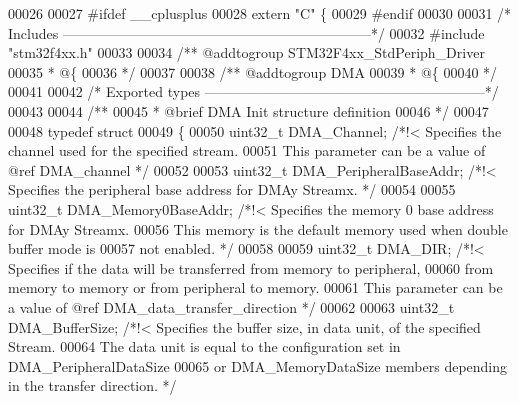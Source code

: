 \begin{DoxyCode}
00026 
00027 \textcolor{preprocessor}{#}\textcolor{preprocessor}{ifdef} \_\_cplusplus
00028  \textcolor{keyword}{extern} \textcolor{stringliteral}{"C"} \{
00029 \textcolor{preprocessor}{#}\textcolor{preprocessor}{endif}
00030 
00031 \textcolor{comment}{/* Includes ------------------------------------------------------------------*/}
00032 \textcolor{preprocessor}{#}\textcolor{preprocessor}{include} "stm32f4xx.h"
00033 
00034 \textcolor{comment}{/** @addtogroup STM32F4xx\_StdPeriph\_Driver}
00035 \textcolor{comment}{  * @\{}
00036 \textcolor{comment}{  */}
00037 
00038 \textcolor{comment}{/** @addtogroup DMA}
00039 \textcolor{comment}{  * @\{}
00040 \textcolor{comment}{  */}
00041 
00042 \textcolor{comment}{/* Exported types ------------------------------------------------------------*/}
00043 
00044 \textcolor{comment}{/** }
00045 \textcolor{comment}{  * @brief  DMA Init structure definition}
00046 \textcolor{comment}{  */}
00047 
00048 \textcolor{keyword}{typedef} \textcolor{keyword}{struct}
00049 \{
00050   uint32\_t DMA_Channel;            \textcolor{comment}{/*!< Specifies the channel used for the specified stream. }
00051 \textcolor{comment}{                                        This parameter can be a value of @ref DMA\_channel */}
00052 
00053   uint32\_t DMA_PeripheralBaseAddr; \textcolor{comment}{/*!< Specifies the peripheral base address for DMAy Streamx. */}
00054 
00055   uint32\_t DMA_Memory0BaseAddr;    \textcolor{comment}{/*!< Specifies the memory 0 base address for DMAy Streamx. }
00056 \textcolor{comment}{                                        This memory is the default memory used when double buffer mode
       is}
00057 \textcolor{comment}{                                        not enabled. */}
00058 
00059   uint32\_t DMA_DIR;                \textcolor{comment}{/*!< Specifies if the data will be transferred from memory to
       peripheral, }
00060 \textcolor{comment}{                                        from memory to memory or from peripheral to memory.}
00061 \textcolor{comment}{                                        This parameter can be a value of @ref
       DMA\_data\_transfer\_direction */}
00062 
00063   uint32\_t DMA_BufferSize;         \textcolor{comment}{/*!< Specifies the buffer size, in data unit, of the specified
       Stream. }
00064 \textcolor{comment}{                                        The data unit is equal to the configuration set in
       DMA\_PeripheralDataSize}
00065 \textcolor{comment}{                                        or DMA\_MemoryDataSize members depending in the transfer
       direction. */}

\end{DoxyCode}
